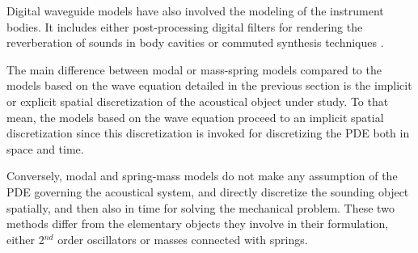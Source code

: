 {{Digital waveguide models have also involved the modeling of the instrument bodies. It includes either post-processing digital filters for rendering the reverberation of sounds in body cavities  or commuted synthesis techniques .






				\label{subsubsubsec:CM_SS_Physics_SO}

The main difference between modal or mass-spring models compared to the models based on the wave equation detailed in the previous section is the implicit or explicit spatial discretization of the acoustical object under study. To that mean, the models based on the wave equation proceed to an implicit spatial discretization since this discretization is invoked for discretizing the PDE both in space and time. 

Conversely, modal and spring-mass models do not make any assumption of the PDE governing the acoustical system, and directly discretize the sounding object spatially, and then also in time for solving the mechanical problem. These two methods differ from the elementary objects they involve in their formulation, either 2$^{nd}$ order oscillators or masses connected with springs.



}}
